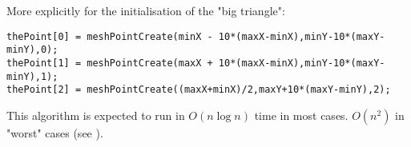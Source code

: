 More explicitly for the initialisation of the "big triangle": 
\begin{verbatim}
thePoint[0] = meshPointCreate(minX - 10*(maxX-minX),minY-10*(maxY-minY),0);
thePoint[1] = meshPointCreate(maxX + 10*(maxX-minX),minY-10*(maxY-minY),1);
thePoint[2] = meshPointCreate((maxX+minX)/2,maxY+10*(maxY-minY),2);
\end{verbatim}

This algorithm is expected to run in $O(n \log n)$ time in most cases. $O(n^2)$ in "worst" cases (see \cite{de2000computational}).

\newpage